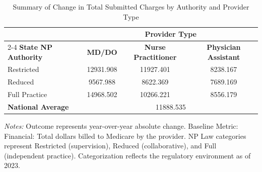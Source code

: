 \begin{table}[htbp]
    \centering
    \caption{Summary of Change in Total Submitted Charges by Authority and Provider Type}
    \label{tab:d_tot_sbmtd_chrg}
    \vspace{0.2cm}
    \begin{tabular}{lccc}
        \toprule
        & \multicolumn{3}{c}{\textbf{Provider Type}} \\
        \cmidrule(lr){2-4}
        \textbf{State NP Authority} & \textbf{MD/DO} & \textbf{Nurse Practitioner} & \textbf{Physician Assistant} \\
        \midrule
        Restricted & 12931.908 & 11927.401 & 8238.167 \\
        Reduced & 9567.988 & 8622.369 & 7689.169 \\
        Full Practice & 14968.502 & 10266.221 & 8556.179 \\
        \midrule
        \textbf{National Average} & \multicolumn{3}{c}{11888.535} \\
        \bottomrule
    \end{tabular}
    \vspace{0.1cm}
    \begin{minipage}{0.85\textwidth}
        \footnotesize \textit{Notes:} Outcome represents year-over-year absolute change. Baseline Metric: Financial: Total dollars billed to Medicare by the provider. NP Law categories represent Restricted (supervision), Reduced (collaborative), and Full (independent practice). Categorization reflects the regulatory environment as of 2023.
    \end{minipage}
\end{table}